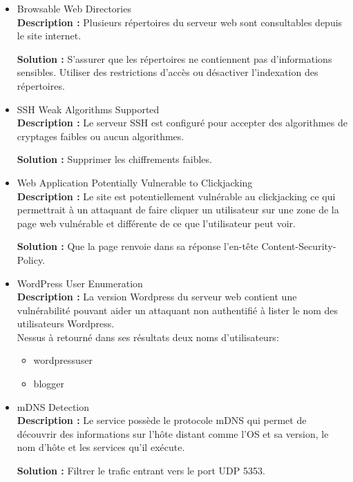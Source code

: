 \documentclass[french,paper=a4,oneside,captions=tableheading]{article}
\begin{document}
\begin{itemize}
    \item Browsable Web Directories \\
\textbf{Description :}
Plusieurs répertoires du serveur web sont consultables depuis le site internet.

\textbf{Solution :}
S'assurer que les répertoires ne contiennent pas d'informations sensibles. Utiliser des restrictions d'accès ou désactiver l'indexation des répertoires.\\

    \item SSH Weak Algorithms Supported \\
\textbf{Description :}
Le serveur SSH est configuré pour accepter des algorithmes de cryptages faibles ou aucun algorithmes.

\textbf{Solution :}
Supprimer les chiffrements faibles.\\

    \item Web Application Potentially Vulnerable to Clickjacking\\
\textbf{Description :}
Le site est potentiellement vulnérable au clickjacking ce qui permettrait à un attaquant de faire cliquer un utilisateur sur une zone de la page web vulnérable et différente de ce que l'utilisateur peut voir.

\textbf{Solution :}
Que la page renvoie dans sa réponse l'en-tête Content-Security-Policy.\\

    \item WordPress User Enumeration \\
\textbf{Description :}
La version Wordpress du serveur web contient une vulnérabilité pouvant aider un attaquant non authentifié à lister le nom des utilisateurs Wordpress. \\
Nessus à retourné dans ses résultats deux noms d'utilisateurs:
\begin{itemize}
    \item wordpressuser
    \item blogger
\end{itemize} \hspace{0.2cm}

    \item mDNS Detection \\
\textbf{Description :}
Le service possède le protocole mDNS qui permet de découvrir des informations sur l'hôte distant comme l'OS et sa version, le nom d'hôte et les services qu'il exécute.

\textbf{Solution :}
Filtrer le trafic entrant vers le port UDP 5353.\\

\end{itemize}
\end{document}
